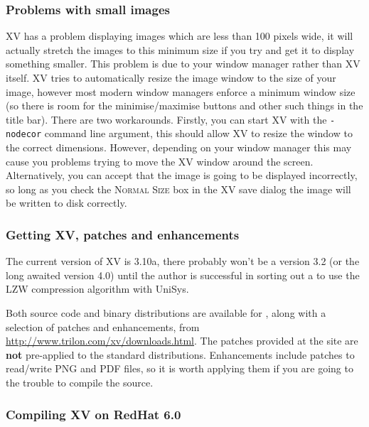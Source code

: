 \documentclass[twoside,11pt]{starlink}
\begin{document}

\subsubsection{Problems with small images}

XV has a problem displaying images which are less than 100 pixels
wide, it will actually stretch the images to this minimum size if you
try and get it to display something smaller. This problem is due to
your window manager rather than XV itself. XV tries to automatically
resize the image window to the size of your image, however most modern
window managers enforce a minimum window size (so there is room for
the minimise/maximise buttons and other such things in the title bar).
There are two workarounds. Firstly, you can start XV with the \texttt{-nodecor} command line argument, this should allow XV to resize the
window to the correct dimensions. However, depending on your window
manager this may cause you problems trying to move the XV window
around the screen. Alternatively, you can accept that the image is
going to be displayed incorrectly, so long as you check the \textsc{Normal Size} box in the XV save dialog the image will be written to
disk correctly.

\subsubsection{Getting XV, patches and enhancements}

The current version of XV is 3.10a, there probably won't be a version
3.2 (or the long awaited version 4.0) until the author is successful
in sorting out a  to use the LZW
compression algorithm with UniSys.

Both source code and binary distributions are available for
,
along with a selection of patches and enhancements, from \url{http://www.trilon.com/xv/downloads.html}. The patches provided at the
site are \textbf{not} pre-applied to the standard distributions.
Enhancements include patches to read/write PNG and PDF files, so it is
worth applying them if you are going to the trouble to compile the
source.

\subsubsection{Compiling XV on RedHat 6.0}
\end{document}
